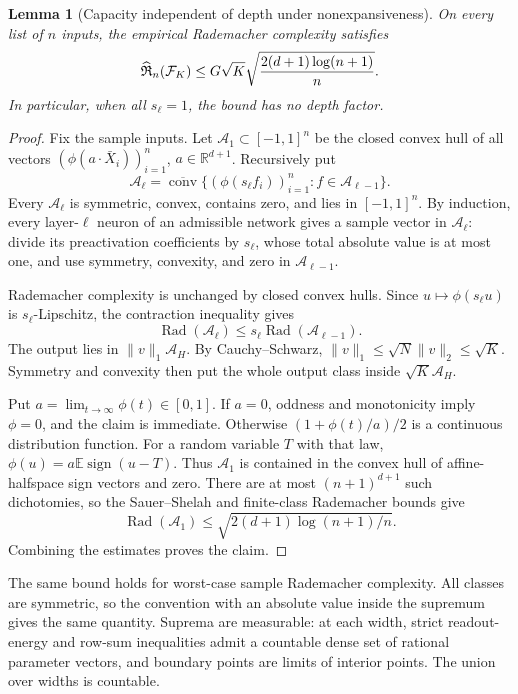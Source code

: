 \documentclass[11pt]{article}
\newtheorem{lemma}[theorem]{Lemma}
\theoremstyle{definition}\newtheorem{definition}[theorem]{Definition}
\theoremstyle{remark}\newtheorem{remark}[theorem]{Remark}
\newcommand{\R}{\mathbb R}\newcommand{\E}{\mathbb E}
\begin{document}
\begin{lemma}[Capacity independent of depth under nonexpansiveness]
\label{lem:capacity}
On every list of $n$ inputs, the empirical Rademacher complexity satisfies
\begin{equation}
 \widehat{\mathfrak R}_n(\mathcal F_K)
 \leq G\sqrt K\sqrt{\frac{2(d+1)\log(n+1)}n}.
 \label{eq:capacity}
\end{equation}
In particular, when all $s_\ell=1$, the bound has no depth factor.
\end{lemma}
\begin{proof}
Fix the sample inputs. Let $\mathcal A_1\subset[-1,1]^n$ be the closed convex hull of all vectors $(\phi(a\cdot\bar X_i))_{i=1}^n$, $a\in\R^{d+1}$. Recursively put
\[
 \mathcal A_\ell=\overline{\operatorname{conv}}
       \{(\phi(s_\ell f_i))_{i=1}^n:f\in\mathcal A_{\ell-1}\}.
\]
Every $\mathcal A_\ell$ is symmetric, convex, contains zero, and lies in $[-1,1]^n$. By induction, every layer-$\ell$ neuron of an admissible network gives a sample vector in $\mathcal A_\ell$: divide its preactivation coefficients by $s_\ell$, whose total absolute value is at most one, and use symmetry, convexity, and zero in $\mathcal A_{\ell-1}$.

Rademacher complexity is unchanged by closed convex hulls. Since $u\mapsto\phi(s_\ell u)$ is $s_\ell$-Lipschitz, the contraction inequality gives
\[
 \operatorname{Rad}(\mathcal A_\ell)
 \leq s_\ell\operatorname{Rad}(\mathcal A_{\ell-1}).
\]
The output lies in $\|v\|_1\mathcal A_H$. By Cauchy--Schwarz,
$\|v\|_1\leq\sqrt N\|v\|_2\leq\sqrt K$. Symmetry and convexity then put the whole output class inside $\sqrt K\mathcal A_H$.

Put $a=\lim_{t\to\infty}\phi(t)\in[0,1]$. If $a=0$, oddness and monotonicity imply $\phi=0$, and the claim is immediate. Otherwise $(1+\phi(t)/a)/2$ is a continuous distribution function. For a random variable $T$ with that law, $\phi(u)=a\E\operatorname{sign}(u-T)$. Thus $\mathcal A_1$ is contained in the convex hull of affine-halfspace sign vectors and zero. There are at most $(n+1)^{d+1}$ such dichotomies, so the Sauer--Shelah and finite-class Rademacher bounds give
\[
 \operatorname{Rad}(\mathcal A_1)
 \leq\sqrt{2(d+1)\log(n+1)/n}.
\]
Combining the estimates proves the claim.
\end{proof}

The same bound holds for worst-case sample Rademacher complexity. All classes are symmetric, so the convention with an absolute value inside the supremum gives the same quantity. Suprema are measurable: at each width, strict readout-energy and row-sum inequalities admit a countable dense set of rational parameter vectors, and boundary points are limits of interior points. The union over widths is countable.
\end{document}
